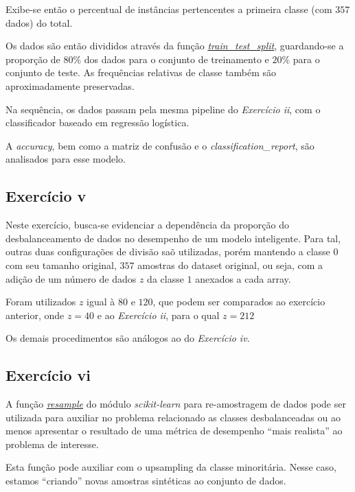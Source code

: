 Exibe-se então o percentual de instâncias pertencentes a primeira classe (com $357$ dados) do total.

Os dados são então divididos através da função \href{https://scikit-learn.org/stable/modules/generated/sklearn.model_selection.train_test_split.html}{\textit{train\_test\_split}}, guardando-se a proporção de $80\%$ dos dados para o conjunto de treinamento e $20\%$ para o conjunto de teste. As frequências relativas de classe também são aproximadamente preservadas.

Na sequência, os dados passam pela mesma pipeline do \textit{Exercício ii}, com o classificador baseado em regressão logística. 

A \textit{accuracy}, bem como a  matriz de confusão  e o \textit{classification\_report}, são analisados para esse modelo.

\subsection{Exercício v}

Neste exercício, busca-se evidenciar a dependência da proporção do desbalanceamento de dados no desempenho de um modelo inteligente. Para tal, outras duas configurações de divisão saõ utilizadas, porém mantendo a classe $0$ com seu tamanho original, $357$ amostras do dataset original, ou seja, com a adição de um número de dados $z$ da classe $1$ anexados a cada array.

Foram utilizados $z$ igual à $80$ e $120$, que podem ser comparados ao exercício anterior, onde $z = 40$ e ao \textit{Exercício ii}, para o qual $z = 212$ 

Os demais procedimentos são análogos ao do \textit{Exercício iv}.

\subsection{Exercício vi}

A função \href{https://scikit-learn.org/stable/modules/generated/sklearn.utils.resample.html}{\textit{resample}} do módulo \textit{scikit-learn} para re-amostragem de dados pode ser utilizada para auxiliar no problema relacionado as classes desbalanceadas ou ao menos apresentar o resultado de uma métrica de desempenho “mais realista” ao problema de interesse.

Esta função pode auxiliar com o upsampling da classe minoritária. Nesse caso, estamos “criando” novas amostras sintéticas ao conjunto de dados.

